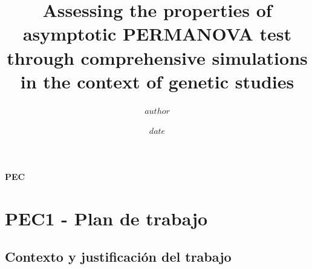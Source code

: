 \documentclass[IB,BIB]{TFUOC}%
\title{Assessing the properties of asymptotic \break PERMANOVA test through comprehensive \break simulations in the context of genetic studies} %
\author{$author$} %
\date{$date$}
\let\oldgls=\gls
\renewcommand{\gls}[1]{{\hypersetup{linkcolor=[RGB]{0,0,0}}
  \oldgls{#1}}}
\begin{document}
\estructura\label{fitxa}

\renewcommand{\bibname}{Referencias}  
\renewcommand{\tablename}{Tabla}
\renewcommand{\figurename}{Figura}
\renewcommand{\listfigurename}{Índice de figuras}
\renewcommand{\listtablename}{Índice de tablas}

\renewcommand*{\glstextformat}{\textbf}

\newpage

\clearpage
{}

\footnotesize %
\tableofcontents
\normalsize

\newpage

\listoffigures


\newpage

\listoftables


\newpage

\listofmyequations


\newpage\null\thispagestyle{empty} %

\Huge
\vfill

\textbf{PEC}
\normalsize

\newpage





\setcounter{chapter}{-1} %
\chapter{PEC1 - Plan de trabajo}
\label{chap:PEC1 - Plan de trabajo}


\section{Contexto y justificación del trabajo}
\label{sec:PEC1 - Contexto y justificación del trabajo}
\end{document}

